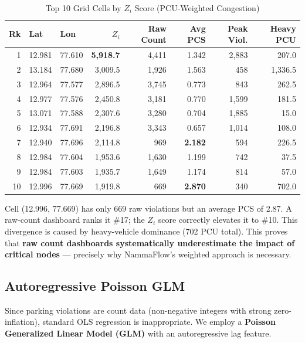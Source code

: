 \documentclass[12pt,a4paper]{article}
\begin{document}
\begin{table}[H]
\centering
\caption{Top 10 Grid Cells by $Z_i$ Score (PCU-Weighted Congestion)}
\small
\begin{tabular}{rllrrrrr}
\toprule
\textbf{Rk} & \textbf{Lat} & \textbf{Lon} & \textbf{$Z_i$} & \textbf{Raw Count} & \textbf{Avg PCS} & \textbf{Peak Viol.} & \textbf{Heavy PCU} \\
\midrule
\rowcolor{alertred!10} 1 & 12.981 & 77.610 & \textbf{5,918.7} & 4,411 & 1.342 & 2,883 & 207.0 \\
2 & 13.184 & 77.680 & 3,009.5 & 1,926 & 1.563 & 458 & 1,336.5 \\
3 & 12.964 & 77.577 & 2,896.5 & 3,745 & 0.773 & 843 & 262.5 \\
4 & 12.977 & 77.576 & 2,450.8 & 3,181 & 0.770 & 1,599 & 181.5 \\
5 & 13.071 & 77.588 & 2,307.6 & 3,280 & 0.704 & 1,885 & 15.0 \\
6 & 12.934 & 77.691 & 2,196.8 & 3,343 & 0.657 & 1,014 & 108.0 \\
7 & 12.940 & 77.696 & 2,114.8 & 969 & \textbf{2.182} & 594 & 226.5 \\
8 & 12.984 & 77.604 & 1,953.6 & 1,630 & 1.199 & 742 & 37.5 \\
9 & 12.984 & 77.603 & 1,935.7 & 1,649 & 1.174 & 814 & 57.0 \\
\rowcolor{gold!8} 10 & 12.996 & 77.669 & 1,919.8 & 669 & \textbf{2.870} & 340 & 702.0 \\
\bottomrule
\end{tabular}
\end{table}

\begin{tcolorbox}[resultbox, title={Critical Insight: Raw Count vs. Impact Score Divergence}]
Cell (12.996, 77.669) has only 669 raw violations but an average PCS of 2.87. A raw-count dashboard ranks it \#17; the $Z_i$ score correctly elevates it to \#10. This divergence is caused by heavy-vehicle dominance (702 PCU total). This proves that \textbf{raw count dashboards systematically underestimate the impact of critical nodes} — precisely why NammaFlow's weighted approach is necessary.
\end{tcolorbox}

\subsection{Autoregressive Poisson GLM}

Since parking violations are count data (non-negative integers with strong zero-inflation), standard OLS regression is inappropriate. We employ a \textbf{Poisson Generalized Linear Model (GLM)} with an autoregressive lag feature.
\end{document}
